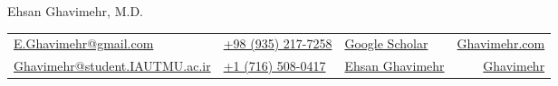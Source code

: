 \documentclass[letterpaper,11pt]{article} %
\begin{document}
\thispagestyle{empty}

\pagestyle{fancy}

\renewcommand{\headrulewidth}{0pt}

\fancyfoot{}

\raggedright
\renewcommand{\arraystretch}{1.5}

\begin{centering}

{\myname\Huge Ehsan Ghavimehr, M.D.}

\vspace{3pt}
\begin{adjustwidth}{-1cm}{-1cm}


\begin{tabular}{l l l r}

		 \textcolor{mycolor}{\faEnvelope[regular]} \space  \href{mailto:e.ghavimehr@gmail.com}{E.Ghavimehr@gmail.com}
		 &
		 \textcolor{mycolor}{\faPhone*} \space  \href{tel:+989352177258}{+98 (935) 217-7258}
		&
		\textcolor{mycolor}{\faGoogle} \space \href{https://scholar.google.com/citations?user=JMu5TZMAAAAJ\&hl=en\&oi=ao}{Google Scholar}
		&
		\textcolor{mycolor}{\faGlobeAmericas} \space \href{https://ghavimehr.com/cv}{Ghavimehr.com}

		\\
		\textcolor{mycolor}{\faEnvelope[regular]} \space  \href{mailto:ghavimehr@student.iautmu.ac.ir}{Ghavimehr@student.IAUTMU.ac.ir}
		&
		\textcolor{mycolor}{\faPhone*} \space  \href{tel:+17165080417}{+1 (716) 508-0417}
		&
		\textcolor{mycolor}{\faResearchgate} \space \href{https://www.researchgate.net/profile/Ehsan-Ghavimehr}{Ehsan Ghavimehr}
		&
		\textcolor{mycolor}{\faLinkedinIn} \space \href{https://www.linkedin.com/in/ghavimehr/}{Ghavimehr}
\end{tabular}
\end{adjustwidth}
\end{centering}
\vspace{3pt}
\end{document}
